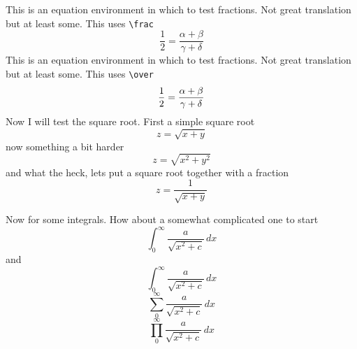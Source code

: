\documentclass{article}
\begin{document}
This is an equation environment in which to test fractions.  Not great translation
but at least some.   This uses \verb#\frac#
$$
\frac{1}{2} = \frac{\alpha+\beta}{\gamma+\delta}
$$
This is an equation environment in which to test fractions.  Not great translation
but at least some.  This uses \verb#\over#
$$
{1 \over 2} = {\alpha+\beta \over \gamma+\delta}
$$
Now I will test the square root.  First a simple square root
$$
z = \sqrt{x+y}
$$
now something a bit harder
$$
z = \sqrt{x^2+y^2}
$$
and what the heck, lets put a square root together with a fraction
$$
z = \frac{1}{\sqrt{x+y}}
$$

Now for some integrals.  How about a somewhat complicated one to start
$$
\int_{0}^{\infty} \frac{a}{\sqrt{x^2+c}}\,dx
$$
and
$$
\int_0^\infty \frac{a}{\sqrt{x^2+c}}\,dx
$$
$$
\sum_0^\infty \frac{a}{\sqrt{x^2+c}}\,dx
$$
$$
\prod_0^\infty \frac{a}{\sqrt{x^2+c}}\,dx
$$
\end{document}
